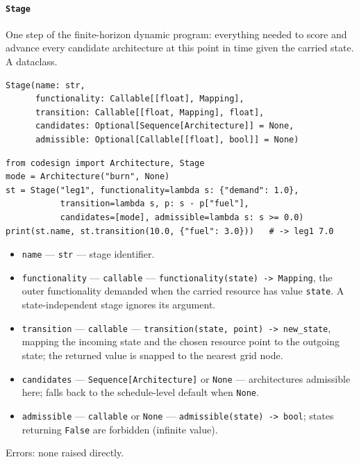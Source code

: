 \documentclass[11pt,a4paper]{article}
\begin{document}
\paragraph{\texttt{Stage}}\label{ref:dynamic:stage}
One step of the finite-horizon dynamic program: everything needed to score
and advance every candidate architecture at this point in time given the
carried state. A dataclass.
\begin{lstlisting}
Stage(name: str,
      functionality: Callable[[float], Mapping],
      transition: Callable[[float, Mapping], float],
      candidates: Optional[Sequence[Architecture]] = None,
      admissible: Optional[Callable[[float], bool]] = None)
\end{lstlisting}
\begin{lstlisting}
from codesign import Architecture, Stage
mode = Architecture("burn", None)
st = Stage("leg1", functionality=lambda s: {"demand": 1.0},
           transition=lambda s, p: s - p["fuel"],
           candidates=[mode], admissible=lambda s: s >= 0.0)
print(st.name, st.transition(10.0, {"fuel": 3.0}))   # -> leg1 7.0
\end{lstlisting}
\begin{itemize}[nosep]
  \item \texttt{name} --- \texttt{str} --- stage identifier.
  \item \texttt{functionality} --- \texttt{callable} ---
    \texttt{functionality(state) -> Mapping}, the outer functionality
    demanded when the carried resource has value \texttt{state}. A
    state-independent stage ignores its argument.
  \item \texttt{transition} --- \texttt{callable} ---
    \texttt{transition(state, point) -> new\_state}, mapping the incoming
    state and the chosen resource point to the outgoing state; the returned
    value is snapped to the nearest grid node.
  \item \texttt{candidates} --- \texttt{Sequence[Architecture]} or
    \texttt{None} --- architectures admissible here; falls back to the
    schedule-level default when \texttt{None}.
  \item \texttt{admissible} --- \texttt{callable} or \texttt{None} ---
    \texttt{admissible(state) -> bool}; states returning \texttt{False} are
    forbidden (infinite value).
\end{itemize}
Errors: none raised directly.
\end{document}
